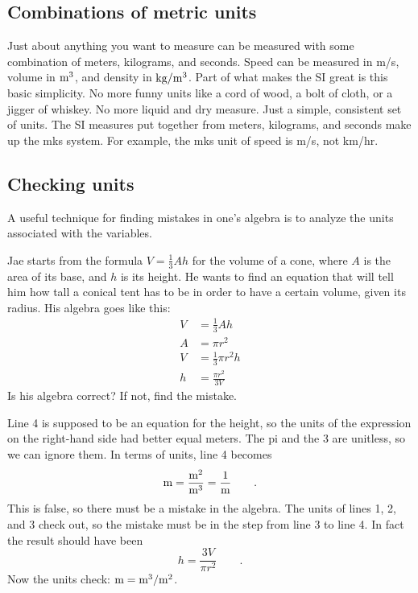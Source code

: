 \vfill
\subsection{Combinations of metric units}


Just about anything you want to measure can be measured with
some combination of meters, kilograms, and seconds.  Speed
can be measured in m/s, volume in $\textup{m}^3$, and density in
$\textup{kg}/\textup{m}^3$. Part of what makes the SI great is this basic
simplicity. No more funny units like a cord of wood, a bolt
of cloth, or a jigger of whiskey. No more liquid and dry
measure. Just a simple, consistent set of units. The SI
measures put together from meters, kilograms, and seconds
make up the mks system. For example, the mks unit of
speed is m/s, not km/hr.


\vfill
\subsection{Checking units}


A useful technique for finding mistakes in one's algebra is to analyze
the units associated with the variables.

\pagebreak[4]

\begin{exmp}
\label{eg:checking-units}

Jae starts from the formula $V=\frac{1}{3}Ah$ for the volume of a
cone, where $A$ is the area of its base, and $h$ is its height.
He wants to find an equation that will tell him how tall a conical
tent has to be in order to have a certain volume, given its radius.
His algebra goes like this:
\begin{align}
  V &= \frac{1}{3}Ah \\
  A &= \pi r^2 \\
  V &= \frac{1}{3}\pi r^2 h\\
  h &= \frac{\pi r^2}{3V}
\end{align}
Is his algebra correct? If not, find the mistake.

Line 4 is supposed to be an equation for the height, so the units of the
expression on the right-hand side had better equal meters.
The pi and the 3 are unitless, so we can ignore them.
In terms of units, line 4 becomes
\begin{equation*}
  \textup{m} = \frac{\textup{m}^2}{\textup{m}^3} = \frac{1}{\textup{m}} \qquad .
\end{equation*}
This is false, so there must be a mistake in the algebra. The units
of lines 1, 2, and 3 check out, so the mistake must be in the step
from line 3 to line 4. In fact the result should have been
\begin{equation*}
  h = \frac{3V}{\pi r^2} \qquad .
\end{equation*}
Now the units check: $\textup{m} = \textup{m}^3/\textup{m}^2$.
\end{exmp}
\divider


